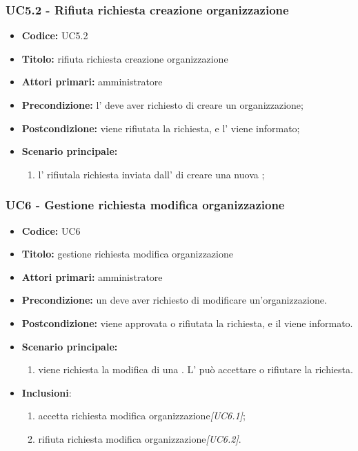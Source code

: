 \documentclass[casi-duso]{subfiles}
\begin{document}
\subsubsection{UC5.2 - Rifiuta richiesta creazione organizzazione}
\label{subsub:UC5.2}
\begin{itemize}
  \item \textbf{Codice:} UC5.2
  \item \textbf{Titolo:} rifiuta richiesta creazione organizzazione
  \item \textbf{Attori primari:} amministratore
  \item \textbf{Precondizione:} l' deve aver richiesto di creare un organizzazione;
  \item \textbf{Postcondizione:} viene rifiutata la richiesta, e l' viene informato;
  \item \textbf{Scenario principale:} 
  \begin{enumerate}
    \item  l' rifiutala richiesta inviata dall' di creare una nuova ;
  \end{enumerate}
\end{itemize}

\subsubsection{UC6 - Gestione richiesta modifica organizzazione}
\label{subsub:UC6}
\begin{itemize}
  \item \textbf{Codice:} UC6
  \item \textbf{Titolo:} gestione richiesta modifica organizzazione
  \item \textbf{Attori primari:} amministratore
  \item \textbf{Precondizione:} un  deve aver richiesto di modificare un'organizzazione.
  \item \textbf{Postcondizione:} viene approvata o rifiutata la richiesta, e il  viene informato.
  \item \textbf{Scenario principale:} 
  \begin{enumerate}
    \item viene richiesta la modifica di una . L' può accettare o rifiutare la richiesta.
  \end{enumerate}
  \item \textbf{Inclusioni}:
  \begin{enumerate}
    \item accetta richiesta modifica organizzazione\emph{[UC6.1]};
    \item rifiuta richiesta modifica organizzazione\emph{[UC6.2]}.
  \end{enumerate}
\end{itemize}
\end{document}
